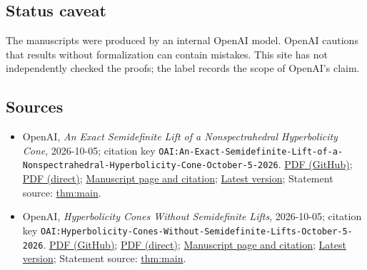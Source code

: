 \documentclass[11pt]{article}
\begin{document}
\subsection{Status caveat}
The manuscripts were produced by an internal OpenAI model. OpenAI cautions that results without formalization can contain mistakes. This site has not independently checked the proofs; the label records the scope of OpenAI's claim.

\subsection{Sources}
\begin{itemize}
\item OpenAI, \emph{An Exact Semidefinite Lift of a Nonspectrahedral Hyperbolicity Cone}, 2026-10-05; citation key \texttt{OAI:An-Exact-Semidefinite-Lift-of-a-Nonspectrahedral-Hyperbolicity-Cone-October-5-2026}. \href{https://github.com/openai/math/blob/adc7f1241b42e322a6451854ab7e4b4c146bf78a/preprints/An-Exact-Semidefinite-Lift-of-a-Nonspectrahedral-Hyperbolicity-Cone-October-5-2026/Exact-Semidefinite-Lift-of-a-Nonspectrahedral-Hyperbolicity-Cone.pdf}{PDF (GitHub)}; \href{https://github.com/openai/math/raw/adc7f1241b42e322a6451854ab7e4b4c146bf78a/preprints/An-Exact-Semidefinite-Lift-of-a-Nonspectrahedral-Hyperbolicity-Cone-October-5-2026/Exact-Semidefinite-Lift-of-a-Nonspectrahedral-Hyperbolicity-Cone.pdf}{PDF (direct)}; \href{https://github.com/openai/math/blob/adc7f1241b42e322a6451854ab7e4b4c146bf78a/preprints/An-Exact-Semidefinite-Lift-of-a-Nonspectrahedral-Hyperbolicity-Cone-October-5-2026/README.md}{Manuscript page and citation}; \href{https://github.com/openai/math/blob/main/preprints/An-Exact-Semidefinite-Lift-of-a-Nonspectrahedral-Hyperbolicity-Cone-October-5-2026/Exact-Semidefinite-Lift-of-a-Nonspectrahedral-Hyperbolicity-Cone.pdf}{Latest version}; Statement source: \href{https://github.com/openai/math/blob/adc7f1241b42e322a6451854ab7e4b4c146bf78a/preprints/An-Exact-Semidefinite-Lift-of-a-Nonspectrahedral-Hyperbolicity-Cone-October-5-2026/build/sections/introduction.tex\#L68}{thm:main}.
\item OpenAI, \emph{Hyperbolicity Cones Without Semidefinite Lifts}, 2026-10-05; citation key \texttt{OAI:Hyperbolicity-Cones-Without-Semidefinite-Lifts-October-5-2026}. \href{https://github.com/openai/math/blob/adc7f1241b42e322a6451854ab7e4b4c146bf78a/preprints/Hyperbolicity-Cones-Without-Semidefinite-Lifts-October-5-2026/nonliftable-hyperbolicity.pdf}{PDF (GitHub)}; \href{https://github.com/openai/math/raw/adc7f1241b42e322a6451854ab7e4b4c146bf78a/preprints/Hyperbolicity-Cones-Without-Semidefinite-Lifts-October-5-2026/nonliftable-hyperbolicity.pdf}{PDF (direct)}; \href{https://github.com/openai/math/blob/adc7f1241b42e322a6451854ab7e4b4c146bf78a/preprints/Hyperbolicity-Cones-Without-Semidefinite-Lifts-October-5-2026/README.md}{Manuscript page and citation}; \href{https://github.com/openai/math/blob/main/preprints/Hyperbolicity-Cones-Without-Semidefinite-Lifts-October-5-2026/nonliftable-hyperbolicity.pdf}{Latest version}; Statement source: \href{https://github.com/openai/math/blob/adc7f1241b42e322a6451854ab7e4b4c146bf78a/preprints/Hyperbolicity-Cones-Without-Semidefinite-Lifts-October-5-2026/build/source/01-introduction.tex\#L33}{thm:main}.

\end{itemize}
\end{document}
